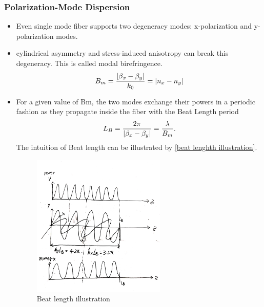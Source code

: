 \documentclass[12pt]{extarticle}
\numberwithin{equation}{section}
\numberwithin{figure}{section}
\numberwithin{table}{section}
\newcommand{\<}{\langle}
\renewcommand{\>}{\rangle}
\theoremstyle{definition}
\begin{document}
        
        \subsubsection{Polarization-Mode Dispersion}
            \begin{itemize}
                \item Even single mode fiber supports two degeneracy modes: x-polarization and y-polarization modes.
                \item cylindrical asymmetry and stress-induced anisotropy can break this degeneracy. This is called modal birefringence. 
                    \begin{equation}
                        B_m = \frac{\abs{\beta_x-\beta_y}}{k_0}=\abs{n_x-n_y}
                        \label{polarization birefringence definition}
                    \end{equation}
                \item For a given value of Bm, the two modes exchange their powers in a periodic fashion as they propagate inside the fiber with the Beat Length period
                    \begin{equation}
                        L_B = \frac{2\pi}{\abs{\beta_x-\beta_y}}=\frac{\lambda}{B_m}.
                        \label{Beat length definition}
                    \end{equation}
                    The intuition of Beat length can be illustrated by \autoref{beat lenghth illustration}.
                    \begin{figure}[htbp]
                        \centering
                        \includegraphics[width=0.6\textwidth]{images/polar_dispersion.jpg}
                        \caption{Beat length illustration}
                        \label{beat lenghth illustration}
                    \end{figure}
                    

\end{itemize}
\end{document}
